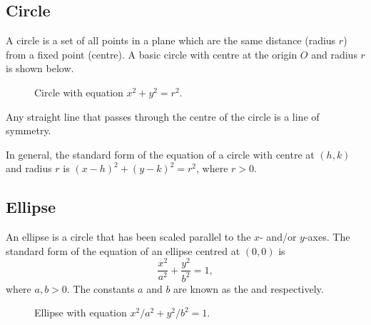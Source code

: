 \subsection{Circle}

A circle is a set of all points in a plane which are the same distance (radius $r$) from a fixed point (centre). A basic circle with centre at the origin $O$ and radius $r$ is shown below.

\begin{figure}[H]
    \centering
    \caption{Circle with equation $x^2 + y^2 = r^2$.}
\end{figure}

Any straight line that passes through the centre of the circle is a line of symmetry.

In general, the standard form of the equation of a circle with centre at $(h, k)$ and radius $r$ is $(x-h)^2 + (y-k)^2 = r^2$, where $r > 0$.

\subsection{Ellipse}

An ellipse is a circle that has been scaled parallel to the $x$- and/or $y$-axes. The standard form of the equation of an ellipse centred at $(0, 0)$ is \[\frac{x^2}{a^2} + \frac{y^2}{b^2} = 1,\] where $a, b > 0$. The constants $a$ and $b$ are known as the  and  respectively.

\begin{figure}[H]
    \centering
    \caption{Ellipse with equation $x^2/a^2 + y^2/b^2 = 1$.}
\end{figure}

